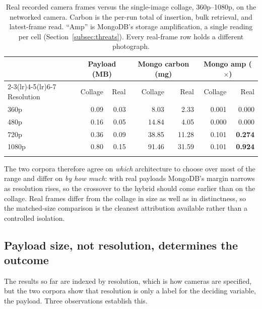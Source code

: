 \documentclass[pdflatex,sn-basic]{sn-jnl}%
\begin{document}
\begin{table}[htbp]
\color{markup}
\caption{Real recorded camera frames versus the single-image collage, 360p--1080p, on the networked camera. Carbon is the per-run total of insertion, bulk retrieval, and latest-frame read. ``Amp'' is MongoDB's storage amplification, a single reading per cell (Section~\ref{subsec:threats}). Every real-frame row holds a different photograph.}\label{tab:realframes}
\small
\begin{tabular}{@{}lrrrrrr@{}}
\toprule
 & \multicolumn{2}{c}{Payload (MB)} & \multicolumn{2}{c}{Mongo carbon (mg)} & \multicolumn{2}{c}{Mongo amp ($\times$)} \\
\cmidrule(lr){2-3}\cmidrule(lr){4-5}\cmidrule(lr){6-7}
Resolution & Collage & Real & Collage & Real & Collage & Real \\
\midrule
360p  & 0.09 & 0.03 &  8.03 &  2.33 & 0.001 & 0.000 \\
480p  & 0.16 & 0.05 & 14.84 &  4.05 & 0.000 & 0.000 \\
720p  & 0.36 & 0.09 & 38.85 & 11.28 & 0.101 & \textbf{0.274} \\
1080p & 0.80 & 0.15 & 91.46 & 31.59 & 0.101 & \textbf{0.924} \\
\botrule
\end{tabular}
\end{table}

{\color{markup}The two corpora therefore agree on \emph{which} architecture to choose over most of the range and differ on \emph{by how much}: with real payloads MongoDB's margin narrows as resolution rises, so the crossover to the hybrid should come earlier than on the collage.} {\color{markup}Real frames differ from the collage in size as well as in distinctness, so the matched-size comparison is the cleanest attribution available rather than a controlled isolation.}

\subsection{Payload size, not resolution, determines the outcome}\label{subsec:sizevsres}
{\color{markup}The results so far are indexed by resolution, which is how cameras are specified, but the two corpora show that resolution is only a label for the deciding variable, the payload.} {\color{markup}Three observations establish this.}
\end{document}
